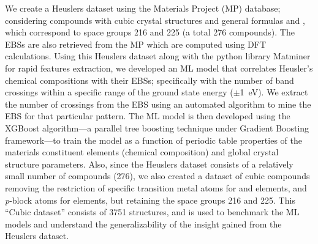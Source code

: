 \documentclass[article]{elsarticle}
\begin{document}
We create a Heuslers dataset using the Materials Project (MP) database;\cite{Jain2013} considering compounds with cubic crystal structures and general formulas  and , which correspond to space groups 216 and 225 (a total \num{276} compounds). The EBSs are also retrieved from the MP which are computed using DFT calculations. Using this Heuslers dataset along with the python library Matminer\cite{WARD201860, Matminer} for rapid features extraction, we developed an ML model that correlates Heusler's chemical compositions with their EBSs; specifically with the number of band crossings within a specific range of the ground state energy ($\pm$\SI{1}{\electronvolt}). We extract the number of crossings from the EBS using an automated algorithm to mine the EBS for that particular pattern. The ML model is then developed using the XGBoost algorithm\cite{chen2016xgboost,chen2015xgboost}---a parallel tree boosting technique under Gradient Boosting framework---to train the model as a function of periodic table properties of the materials constituent elements (chemical composition) and global crystal structure parameters. Also, since the Heuslers dataset consists of a relatively small number of compounds (\num{276}), we also created a dataset of cubic compounds removing the restriction of specific transition metal atoms for  and  elements, and \textit{p}-block atoms for  elements, but retaining the space groups \num{216} and \num{225}. This ``Cubic dataset'' consists of \num{3751} structures, and is used to benchmark the ML models and understand the generalizability of the insight gained from the Heuslers dataset.
\end{document}
